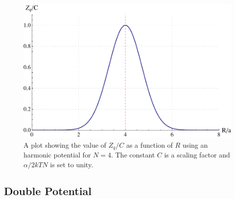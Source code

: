 \begin{figure}[htp]
\centering \includegraphics[scale=0.6]{Graphics/zElasticPotential.pdf} 
\caption{A plot showing the value of $Z_{q}/C$ as a function of $R$ using
an harmonic potential for $N=4$. The constant $C$ is a scaling factor and $\alpha/2kTN$ is set to unity.}
\label{fig:GraphElasticPotential} 
\end{figure}

\subsection{Double Potential}

